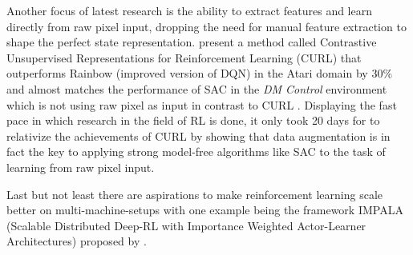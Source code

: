 Another focus of latest research is the ability to extract features and learn directly from raw pixel input, dropping the need for manual feature extraction to shape the perfect state representation. \cite{srinivas2020curl} present a method called Contrastive Unsupervised Representations for Reinforcement Learning (CURL) that outperforms Rainbow (improved version of DQN) in the Atari domain by 30\% and almost matches the performance of SAC in the \textit{DM Control} environment which is not using raw pixel as input in contrast to CURL \cite[p.~7]{srinivas2020curl}. Displaying the fast pace in which research in the field of RL is done, it only took 20 days for \cite{kostrikov2021image} to relativize the achievements of CURL by showing that data augmentation is in fact the key to applying strong model-free algorithms like SAC to the task of learning from raw pixel input.
\par 
Last but not least there are aspirations to make reinforcement learning scale 
better on multi-machine-setups with one example being the framework IMPALA (Scalable Distributed Deep-RL with Importance Weighted
Actor-Learner Architectures) proposed by \cite{espeholt2018impala}.
